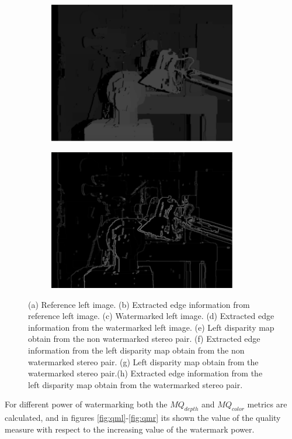 \begin{figure}[h!]
\begin{subfigure}[]{0.4\textwidth}
\caption{\label{fig:lds}}
\end{subfigure}
\begin{subfigure}[]{0.4\textwidth}
\centering
\includegraphics[width=0.9\textwidth]{./img/rdisp.png}
\caption{\label{fig:rd}}
\end{subfigure}
\begin{subfigure}[]{0.4\textwidth}
\centering
\includegraphics[width=0.9\textwidth]{./img/rdisp_sobel.png}
\caption{\label{rds}}
\end{subfigure}
\caption{\small{(a) Reference left image. (b) Extracted edge information from reference left image. (c) Watermarked left image. (d) Extracted edge information from the watermarked left image. (e) Left disparity map obtain from the non watermarked stereo pair. (f) Extracted edge information from the left disparity map obtain from the non watermarked stereo pair. (g)  Left disparity map obtain from the watermarked stereo pair.(h) Extracted edge information from the left disparity map obtain from the watermarked stereo pair. }\label{fig:sobel}}
\end{figure}
\clearpage
For different power of watermarking both the $MQ_{depth}$ and $MQ_{color}$ metrics are calculated, and in figures \ref{fig:qml}-\ref{fig:qmr} its shown the value of the quality measure with respect to the increasing value of the watermark power. 

